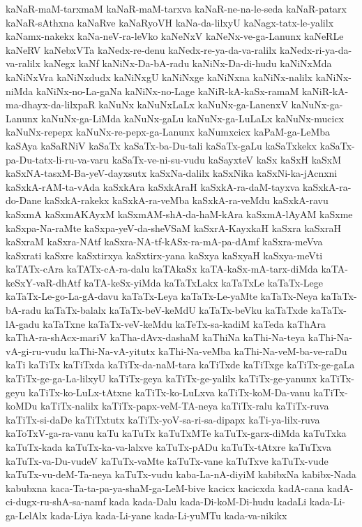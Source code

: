 {kaNaR-maM-tarxmaM
kaNaR-maM-tarxva
kaNaR-ne-na-le-seda
kaNaR-patarx
kaNaR-sAthxna
kaNaRve
kaNaRyoVH
kaNa-da-lilxyU
kaNagx-tatx-le-yalilx
kaNamx-nakekx
kaNa-neV-ra-leVko
kaNeNxV
kaNeNx-ve-ga-Lanunx
kaNeRLe
kaNeRV
kaNebxVTa
kaNedx-re-denu
kaNedx-re-ya-da-va-ralilx
kaNedx-ri-ya-da-va-ralilx
kaNegx
kaNf
kaNiNx-Da-bA-radu
kaNiNx-Da-di-hudu
kaNiNxMda
kaNiNxVra
kaNiNxdudx
kaNiNxgU
kaNiNxge
kaNiNxna
kaNiNx-nalilx
kaNiNx-niMda
kaNiNx-no-La-gaNa
kaNiNx-no-Lage
kaNiR-kA-kaSx-ramaM
kaNiR-kA-ma-dhayx-da-lilxpaR
kaNuNx
kaNuNxLaLx
kaNuNx-ga-LanenxV
kaNuNx-ga-Lanunx
kaNuNx-ga-LiMda
kaNuNx-gaLu
kaNuNx-ga-LuLaLx
kaNuNx-mucicx
kaNuNx-repepx
kaNuNx-re-pepx-ga-Lanunx
kaNumxcicx
kaPaM-ga-LeMba
kaSAya
kaSaRNiV
kaSaTx
kaSaTx-ba-Du-tali
kaSaTx-gaLu
kaSaTxkekx
kaSaTx-pa-Du-tatx-li-ru-va-varu
kaSaTx-ve-ni-su-vudu
kaSayxteV
kaSx
kaSxH
kaSxM
kaSxNA-tasxM-Ba-yeV-dayxsutx
kaSxNa-dalilx
kaSxNika
kaSxNi-ka-jAcnxni
kaSxkA-rAM-ta-vAda
kaSxkAra
kaSxkAraH
kaSxkA-ra-daM-tayxva
kaSxkA-ra-do-Dane
kaSxkA-rakekx
kaSxkA-ra-veMba
kaSxkA-ra-veMdu
kaSxkA-ravu
kaSxmA
kaSxmAKAyxM
kaSxmAM-shA-da-haM-kAra
kaSxmA-lAyAM
kaSxme
kaSxpa-Na-raMte
kaSxpa-yeV-da-sheVSaM
kaSxrA-KayxkaH
kaSxra
kaSxraH
kaSxraM
kaSxra-NAtf
kaSxra-NA-tf-kASx-ra-mA-pa-dAmf
kaSxra-meVva
kaSxrati
kaSxre
kaSxtirxya
kaSxtirx-yana
kaSxya
kaSxyaH
kaSxya-meVti
kaTATx-cAra
kaTATx-cA-ra-dalu
kaTAkaSx
kaTA-kaSx-mA-tarx-diMda
kaTA-keSxY-vaR-dhAtf
kaTA-keSx-yiMda
kaTaTxLakx
kaTaTxLe
kaTaTx-Lege
kaTaTx-Le-go-La-gA-davu
kaTaTx-Leya
kaTaTx-Le-yaMte
kaTaTx-Neya
kaTaTx-bA-radu
kaTaTx-balalx
kaTaTx-beV-keMdU
kaTaTx-beVku
kaTaTxde
kaTaTx-lA-gadu
kaTaTxne
kaTaTx-veV-keMdu
kaTeTx-sa-kadiM
kaTeda
kaThAra
kaThA-ra-shAcx-mariV
kaTha-dAvx-dashaM
kaThiNa
kaThi-Na-teya
kaThi-Na-vA-gi-ru-vudu
kaThi-Na-vA-yitutx
kaThi-Na-veMba
kaThi-Na-veM-ba-ve-raDu
kaTi
kaTiTx
kaTiTxda
kaTiTx-da-naM-tara
kaTiTxde
kaTiTxge
kaTiTx-ge-gaLa
kaTiTx-ge-ga-La-lilxyU
kaTiTx-geya
kaTiTx-ge-yalilx
kaTiTx-ge-yanunx
kaTiTx-geyu
kaTiTx-ko-LuLx-tAtxne
kaTiTx-ko-LuLxva
kaTiTx-koM-Da-vanu
kaTiTx-koMDu
kaTiTx-nalilx
kaTiTx-papx-veM-TA-neya
kaTiTx-ralu
kaTiTx-ruva
kaTiTx-si-daDe
kaTiTxtutx
kaTiTx-yoV-sa-ri-sa-dipapx
kaTi-ya-lilx-ruva
kaToTxV-ga-ra-vanu
kaTu
kaTuTx
kaTuTxMTe
kaTuTx-garx-diMda
kaTuTxka
kaTuTx-kada
kaTuTx-ka-va-lalxve
kaTuTx-pADu
kaTuTx-tAtxre
kaTuTxva
kaTuTx-va-Du-vudeV
kaTuTx-vaMte
kaTuTx-vane
kaTuTxve
kaTuTx-vude
kaTuTx-vu-deM-Ta-neya
kaTuTx-vudu
kaba-La-nA-diyiM
kabibxNa
kabibx-Nada
kabubxna
kaca-Ta-ta-pa-ya-shaM-ga-LeM-bive
kacicx
kacicxda
kadA-cana
kadA-ci-dugx-ru-shA-sa-namf
kada
kada-Dalu
kada-Di-koM-Di-hudu
kadaLi
kada-Li-ga-LelAlx
kada-Liya
kada-Li-yane
kada-Li-yuMTu
kada-va-nikikx
}
